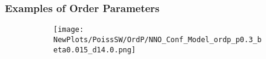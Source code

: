 \documentclass[xcolor={dvipsnames}, aspectratio = 43]{beamer}
\begin{document}
\begin{frame}
	\frametitle{Examples of Order Parameters}
	\begin{figure}[t]
		\begin{subfigure}[t]{\linewidth}
			\vspace{-0.5cm}
			\centering
			\texttt{[image: NewPlots/PoissSW/OrdP/NNO\_Conf\_Model\_ordp\_p0.3\_beta0.015\_d14.0.png]}
			\label{fig:Ordp_OPSW_highmu_COVID19}
		\end{subfigure}
		\label{fig:Ordp_OPSW_COVID19_panel}
	\end{figure}
\end{frame}
\end{document}
